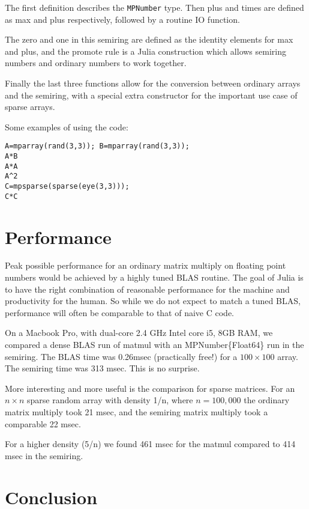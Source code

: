 \documentclass[conference]{IEEEtran}
\begin{document}
The first definition describes the \verb+MPNumber+ type.
Then plus and times are defined as max and plus respectively, followed by
a routine IO function.

The zero and one in this semiring are defined as the identity elements for max and plus,
and the promote rule is a Julia construction which allows semiring numbers and ordinary
numbers to work together.

Finally the last three functions allow for the conversion between ordinary arrays and the semiring, with a special extra constructor for the important use case of sparse arrays.

Some examples of using the code:


\begin{verbatim}
A=mparray(rand(3,3)); B=mparray(rand(3,3));
A*B
A*A
A^2
C=mpsparse(sparse(eye(3,3)));
C*C
\end{verbatim}





\section{Performance}

Peak possible performance for an ordinary matrix multiply on floating point numbers
would be achieved by a highly tuned BLAS routine.
The goal of Julia is to have the right combination of reasonable performance
for the machine and productivity for the human.  So while we do not expect to match
a tuned BLAS, performance will often be comparable to that of naive C code.

On a Macbook Pro, with dual-core 2.4 GHz Intel core i5, 8GB RAM, we compared a dense BLAS run of matmul with an MPNumber\{Float64\} run in the semiring.
The BLAS time was 0.26msec (practically free!) for a $100 \times 100$ array.  The semiring time
was 313 msec.  This is no surprise.

More interesting and more useful is the comparison for sparse matrices.  For an $n \times n$ sparse random array with density 1/n, where $n = 100,000$ the ordinary matrix multiply took 21 msec, and the semiring matrix multiply took a comparable 22 msec.

For a higher density (5/n) we found 461 msec for the matmul compared to 414 msec in the semiring.


\section{Conclusion}
\end{document}
